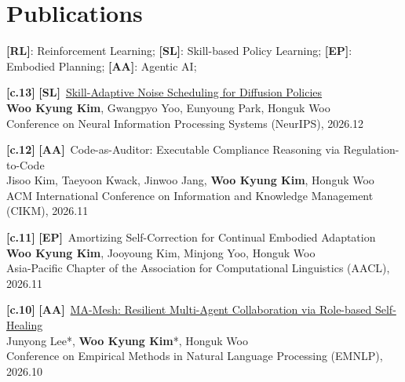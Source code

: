 \documentclass[letterpaper,11pt]{article}
\newcommand{\RL}{\textbf{\textcolor{RLgreen}{[RL]}}}
\newcommand{\SL}{\textbf{\textcolor{SLpurple}{[SL]}}}
\newcommand{\EP}{\textbf{\textcolor{EPblue}{[EP]}}}
\newcommand{\Aa}{\textbf{\textcolor{AAred}{[AA]}}}
\begin{document}
\section{Publications}
 \begin{itemize}[leftmargin=0.15in, label={}]
    \small{\item{
    \vspace{1mm}
    \RL: Reinforcement Learning;
    \SL : Skill-based Policy Learning;
    \EP : Embodied Planning;
    \Aa : Agentic AI; \\
    \vspace{1.5mm}

    \textbf{[c.13]} \SL \ {\href{https://arxiv.org/abs/2611.30264}{Skill-Adaptive Noise Scheduling for Diffusion Policies}} \\
    {\textbf{Woo Kyung Kim}, Gwangpyo Yoo, Eunyoung Park, Honguk Woo} \\
    {Conference on Neural Information Processing Systems (NeurIPS), 2026.12} \\
    \vspace{1.5mm}

    \textbf{[c.12]} \Aa \ {\href{}{}Code-as-Auditor: Executable Compliance Reasoning via Regulation-to-Code} \\
    {Jisoo Kim, Taeyoon Kwack, Jinwoo Jang, \textbf{Woo Kyung Kim}, Honguk Woo} \\
    {ACM International Conference on Information and Knowledge Management (CIKM), 2026.11} \\
    \vspace{1.5mm}

    \textbf{[c.11]} \EP \ {Amortizing Self-Correction for Continual Embodied Adaptation} \\
    {\textbf{Woo Kyung Kim}, Jooyoung Kim, Minjong Yoo, Honguk Woo} \\
    {Asia-Pacific Chapter of the Association for Computational Linguistics (AACL), 2026.11} \\
    \vspace{1.5mm}

    \textbf{[c.10]} \Aa \ {\href{https://aclanthology.org/2026.emnlp-main.1443/}{MA-Mesh: Resilient Multi-Agent Collaboration via Role-based Self-Healing}} \\
    {Junyong Lee*, \textbf{Woo Kyung Kim}*, Honguk Woo} \\
    {Conference on Empirical Methods in Natural Language Processing (EMNLP), 2026.10} \\
    \vspace{1.5mm}

}}
\end{itemize}
\end{document}
